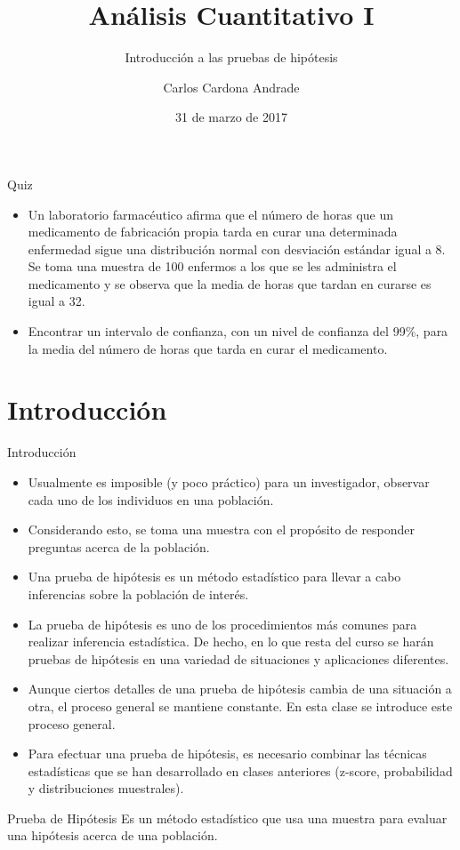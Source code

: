 \documentclass{beamer}
\title{Análisis Cuantitativo I}
\subtitle{Introducción a las pruebas de hipótesis}
\author[Carlos Cardona]{Carlos Cardona Andrade}
\institute[URosario]{Universidad del Rosario}
\date{31 de marzo de 2017}
\begin{document}
\frame{\titlepage}
\begin{frame}{Quiz}
\begin{itemize}
\justifying
\item Un laboratorio farmacéutico afirma que el número de horas que un medicamento de
fabricación propia tarda en curar una determinada enfermedad sigue una distribución normal con
desviación estándar igual a 8. Se toma una muestra de 100 enfermos a los que se les administra
el medicamento y se observa que la media de horas que tardan en curarse es igual a 32.
\item Encontrar un intervalo de confianza, con un nivel de confianza del 99\%, para la media del
número de horas que tarda en curar el medicamento.
\end{itemize}
\end{frame}

\section{Introducción}
\begin{frame}{Introducción}
\begin{itemize}
\justifying
\item Usualmente es imposible (y poco práctico) para un investigador, observar cada uno de los individuos en una población.
\item Considerando esto, se toma una muestra con el propósito de responder preguntas acerca de la población.
\item Una prueba de hipótesis es un método estadístico para llevar a cabo inferencias sobre la población de interés.
\item La prueba de hipótesis es uno de los procedimientos más comunes para realizar inferencia estadística. De hecho, en lo que resta del curso se harán pruebas de hipótesis en una variedad de situaciones y aplicaciones diferentes. 
\end{itemize}
\end{frame}

\begin{frame}
\begin{itemize}
\justifying
\item Aunque ciertos detalles de una prueba de hipótesis cambia de una situación a otra, el proceso general se mantiene constante. En esta clase se introduce este proceso general.
\item Para efectuar una prueba de hipótesis, es necesario combinar las técnicas estadísticas que se han desarrollado en clases anteriores (z-score, probabilidad y distribuciones muestrales). 
\end{itemize}
\begin{block}{Prueba de Hipótesis}
Es un método estadístico que usa una muestra para evaluar una hipótesis acerca de una población.
\end{block}
\end{frame}
\end{document}
